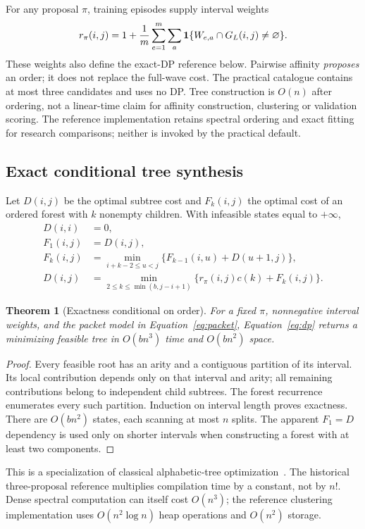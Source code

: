 \documentclass[11pt]{article}
\newtheorem{theorem}{Theorem}\newtheorem{proposition}[theorem]{Proposition}\newtheorem{lemma}[theorem]{Lemma}
\theoremstyle{definition}\newtheorem{definition}[theorem]{Definition}
\begin{document}
For any proposal $\pi$, training episodes supply interval weights
\begin{equation}\label{eq:weight}
 r_\pi(i,j)=1+\frac1m\sum_{e=1}^m\sum_a
 \mathbf 1\{W_{e,a}\cap G_L(i,j)\ne\varnothing\}.
\end{equation}
These weights also define the exact-DP reference below. Pairwise affinity \emph{proposes} an order; it does not replace the full-wave cost. The practical catalogue contains at most three candidates and uses no DP. Tree construction is $O(n)$ after ordering, not a linear-time claim for affinity construction, clustering or validation scoring. The reference implementation retains spectral ordering and exact fitting for research comparisons; neither is invoked by the practical default.

\subsection{Exact conditional tree synthesis}
Let $D(i,j)$ be the optimal subtree cost and $F_k(i,j)$ the optimal cost of an ordered forest with $k$ nonempty children. With infeasible states equal to $+\infty$,
\begin{align}
 D(i,i)&=0,\\
 F_1(i,j)&=D(i,j),\\
 F_k(i,j)&=\min_{i+k-2\le u<j}\{F_{k-1}(i,u)+D(u+1,j)\},\\
 D(i,j)&=\min_{2\le k\le\min(b,j-i+1)}\{r_\pi(i,j)c(k)+F_k(i,j)\}.\label{eq:dp}
\end{align}
\begin{theorem}[Exactness conditional on order]\label{thm:exact}
For a fixed $\pi$, nonnegative interval weights, and the packet model in Equation~\eqref{eq:packet}, Equation~\eqref{eq:dp} returns a minimizing feasible tree in $O(bn^3)$ time and $O(bn^2)$ space.
\end{theorem}
\begin{proof}
Every feasible root has an arity and a contiguous partition of its interval. Its local contribution depends only on that interval and arity; all remaining contributions belong to independent child subtrees. The forest recurrence enumerates every such partition. Induction on interval length proves exactness. There are $O(bn^2)$ states, each scanning at most $n$ splits. The apparent $F_1=D$ dependency is used only on shorter intervals when constructing a forest with at least two components.\end{proof}
This is a specialization of classical alphabetic-tree optimization~\cite{alphabetic}. The historical three-proposal reference multiplies compilation time by a constant, not by $n!$. Dense spectral computation can itself cost $O(n^3)$; the reference clustering implementation uses $O(n^2\log n)$ heap operations and $O(n^2)$ storage.
\end{document}

